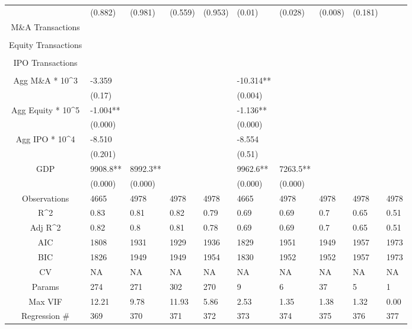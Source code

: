 \documentclass{article}
\begin{document}
\begin{table}[H]
\begin{tabular}{|clllllllll|}
   & (0.882) & (0.981) & (0.559) & (0.953) & (0.01) & (0.028) & (0.008) & (0.181) &  \\
  M\&A Transactions &  &  &  &  &  &  &  &  &  \\
   &  &  &  &  &  &  &  &  &  \\
  Equity Transactions &  &  &  &  &  &  &  &  &  \\
   &  &  &  &  &  &  &  &  &  \\
  IPO Transactions &  &  &  &  &  &  &  &  &  \\
   &  &  &  &  &  &  &  &  &  \\
  Agg M\&A * 10^3 & -3.359 &  &  &  & -10.314** &  &  &  &  \\
   & (0.17) &  &  &  & (0.004) &  &  &  &  \\
  Agg Equity * 10^5 & -1.004** &  &  &  & -1.136** &  &  &  &  \\
   & (0.000) &  &  &  & (0.000) &  &  &  &  \\
  Agg IPO * 10^4 & -8.510 &  &  &  & -8.554 &  &  &  &  \\
   & (0.201) &  &  &  & (0.51) &  &  &  &  \\
  GDP & 9908.8** & 8992.3** &  &  & 9962.6** & 7263.5** &  &  &  \\
   & (0.000) & (0.000) &  &  & (0.000) & (0.000) &  &  &  \\
  \hline
 Observations & 4665 & 4978 & 4978 & 4978 & 4665 & 4978 & 4978 & 4978 & 4978 \\
  R^2 & 0.83 & 0.81 & 0.82 & 0.79 & 0.69 & 0.69 & 0.7 & 0.65 & 0.51 \\
  Adj R^2 & 0.82 & 0.8 & 0.81 & 0.78 & 0.69 & 0.69 & 0.7 & 0.65 & 0.51 \\
  AIC & 1808 & 1931 & 1929 & 1936 & 1829 & 1951 & 1949 & 1957 & 1973 \\
  BIC & 1826 & 1949 & 1949 & 1954 & 1830 & 1952 & 1952 & 1957 & 1973 \\
  CV & NA & NA & NA & NA & NA & NA & NA & NA & NA \\
  Params & 274 & 271 & 302 & 270 & 9 & 6 & 37 & 5 & 1 \\
  Max VIF & 12.21 & 9.78 & 11.93 & 5.86 & 2.53 & 1.35 & 1.38 & 1.32 & 0.00 \\
  Regression \# & 369 & 370 & 371 & 372 & 373 & 374 & 375 & 376 & 377 \\
   \hline
\end{tabular}

\end{table}
\end{document}
